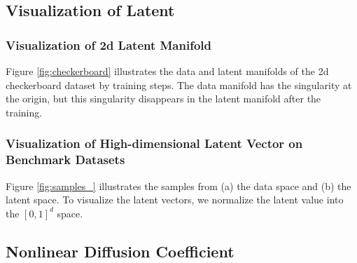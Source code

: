 \documentclass{article}
\theoremstyle{definition}
\theoremstyle{remark}
\begin{document}
	\subsection{Visualization of Latent}
	
	\subsubsection{Visualization of 2d Latent Manifold}
	
	Figure \ref{fig:checkerboard} illustrates the data and latent manifolds of the 2d checkerboard dataset by training steps. The data manifold has the singularity at the origin, but this singularity disappears in the latent manifold after the training.
	
	\subsubsection{Visualization of High-dimensional Latent Vector on Benchmark Datasets}\label{appendix:visualization}
	
	Figure \ref{fig:samples_} illustrates the samples from (a) the data space and (b) the latent space. To visualize the latent vectors, we normalize the latent value into the $[0,1]^{d}$ space.
	
	
	\subsection{Nonlinear Diffusion Coefficient}\label{appendix:nonlinear_term}
	
\end{document}

